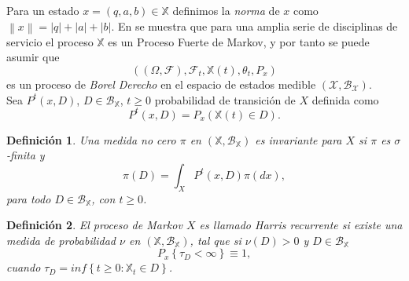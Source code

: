 \documentclass{article}
\newtheorem{Def}{Definición}[section]
\numberwithin{equation}{section}
\begin{document}
Para un estado $x=\left(q,a,b\right)\in\mathbb{X}$ definimos la {\em norma} de $x$ como $\left\|x\right\|=|q|+|a|+|b|$. En \cite{Dai} se muestra que para una amplia serie de disciplinas de servicio el proceso $\mathbb{X}$ es un Proceso Fuerte de Markov, y por tanto se puede asumir que \[\left(\left(\Omega,\mathcal{F}\right),\mathcal{F}_{t},\mathbb{X}\left(t\right),\theta_{t},P_{x}\right)\] es un proceso de {\em Borel Derecho} en el espacio de estados medible $\left(\mathcal{X},\mathcal{B}_{\mathcal{X}}\right)$.\\

Sea $P^{t}\left(x,D\right)$, $D\in\mathcal{B}_{\mathbb{X}}$, $t\geq0$ probabilidad de transici\'on de $X$ definida como \[P^{t}\left(x,D\right)=P_{x}\left(\mathbb{X}\left(t\right)\in D\right).\]

\begin{Def}
Una medida no cero $\pi$ en $\left(\mathbb{X},\mathcal{B}_{\mathbb{X}}\right)$ es {\em invariante} para $X$ si $\pi$ es $\sigma$-finita y
\[\pi\left(D\right)=\int_{X}P^{t}\left(x,D\right)\pi\left(dx\right),\] para todo $D\in \mathcal{B}_{\mathbb{X}}$, con $t\geq0$.
\end{Def}

\begin{Def}
El proceso de Markov $X$ es llamado {\em Harris recurrente} si existe una medida de probabilidad $\nu$ en $\left(\mathbb{X},\mathcal{B}_{\mathbb{X}}\right)$, tal que si $\nu\left(D\right)>0$ y $D\in\mathcal{B}_{\mathbb{X}}$ \[P_{x}\left\{\tau_{D}<\infty\right\}\equiv1,\] cuando $\tau_{D}=inf\left\{t\geq0:\mathbb{X}_{t}\in D\right\}$.
\end{Def}
\end{document}
